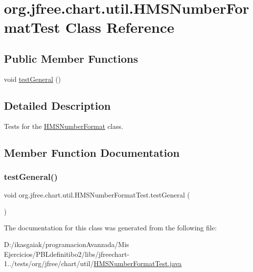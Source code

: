\hypertarget{classorg_1_1jfree_1_1chart_1_1util_1_1_h_m_s_number_format_test}{}\section{org.\+jfree.\+chart.\+util.\+H\+M\+S\+Number\+Format\+Test Class Reference}
\label{classorg_1_1jfree_1_1chart_1_1util_1_1_h_m_s_number_format_test}
\subsection*{Public Member Functions}
\begin{DoxyCompactItemize}
\item 
void \mbox{\hyperlink{classorg_1_1jfree_1_1chart_1_1util_1_1_h_m_s_number_format_test_a4225ea2a575a623ff8cc4ed31e096172}{test\+General}} ()
\end{DoxyCompactItemize}


\subsection{Detailed Description}
Tests for the \mbox{\hyperlink{classorg_1_1jfree_1_1chart_1_1util_1_1_h_m_s_number_format}{H\+M\+S\+Number\+Format}} class. 

\subsection{Member Function Documentation}
\mbox{\label{classorg_1_1jfree_1_1chart_1_1util_1_1_h_m_s_number_format_test_a4225ea2a575a623ff8cc4ed31e096172}} 
\subsubsection{\texorpdfstring{test\+General()}{testGeneral()}}
{\footnotesize\ttfamily void org.\+jfree.\+chart.\+util.\+H\+M\+S\+Number\+Format\+Test.\+test\+General (\begin{DoxyParamCaption}{ }\end{DoxyParamCaption})}



The documentation for this class was generated from the following file\+:\begin{DoxyCompactItemize}
\item 
D\+:/ikasgaiak/programacion\+Avanzada/\+Mis Ejercicios/\+P\+B\+Ldefinitibo2/libs/jfreechart-\/1../tests/org/jfree/chart/util/\mbox{\hyperlink{_h_m_s_number_format_test_8java}{H\+M\+S\+Number\+Format\+Test.\+java}}\end{DoxyCompactItemize}
